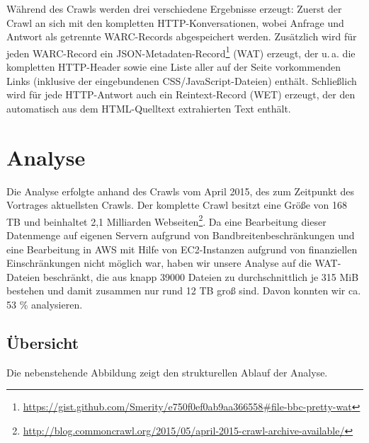 \documentclass[a4paper,12pt,titlepage=false]{scrreprt}
\begin{document}
Während des Crawls werden drei verschiedene Ergebnisse erzeugt: Zuerst der Crawl an sich mit den kompletten HTTP-Konversationen, wobei Anfrage und Antwort als getrennte WARC-Records abgespeichert werden. Zusätzlich wird für jeden WARC-Record ein JSON-Metadaten-Record\footnote{\url{https://gist.github.com/Smerity/e750f0ef0ab9aa366558\#file-bbc-pretty-wat}} (WAT) erzeugt, der u.\,a. die kompletten HTTP-Header sowie eine Liste aller auf der Seite vorkommenden Links (inklusive der eingebundenen CSS/JavaScript-Dateien) enthält. Schließlich wird für jede HTTP-Antwort auch ein Reintext-Record (WET) erzeugt, der den automatisch aus dem HTML-Quelltext extrahierten Text enthält.


\chapter{Analyse}

Die Analyse erfolgte anhand des Crawls vom April 2015, des zum Zeitpunkt des
Vortrages aktuellsten Crawls. Der komplette Crawl besitzt eine Größe von 168 TB und beinhaltet 2,1 Milliarden Webseiten\footnote{\url{http://blog.commoncrawl.org/2015/05/april-2015-crawl-archive-available/}}.
Da eine Bearbeitung dieser Datenmenge auf eigenen Servern aufgrund von
Bandbreitenbeschränkungen und eine Bearbeitung in AWS mit Hilfe von EC2-Instanzen
aufgrund von finanziellen Einschränkungen nicht möglich war, haben wir unsere
Analyse auf die WAT-Dateien beschränkt, die aus knapp 39000 Dateien zu
durchschnittlich je 315 MiB bestehen und damit zusammen nur rund 12 TB groß sind.
Davon konnten wir ca. 53 \% analysieren.

\section{Übersicht}

\begin{figure}
\label{wrap-fig:1}
\end{figure}

Die nebenstehende Abbildung zeigt den strukturellen Ablauf der Analyse.
\end{document}
